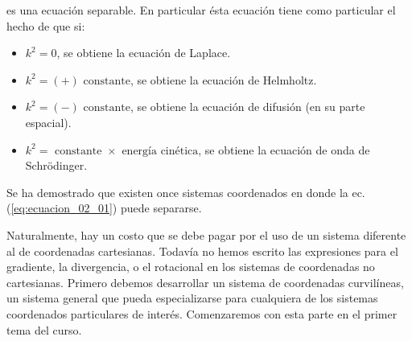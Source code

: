 es una ecuación separable.  En particular ésta ecuación tiene como particular el hecho de que si:
\begin{itemize}
\item $k^{2} = 0$, se obtiene la ecuación de Laplace.
\item $k^{2} = (+) \mbox{ constante}$, se obtiene la ecuación de Helmholtz.
\item $k^{2} = (-) \mbox{ constante}$, se obtiene la ecuación de difusión (en su parte espacial).
\item $k^{2} = \mbox{ constante } \times \mbox{ energía cinética}$, se obtiene la ecuación de onda de Schrödinger.
\end{itemize}
Se ha demostrado que existen once sistemas coordenados en donde la ec. (\ref{eq:ecuacion_02_01}) puede separarse. 
\par
Naturalmente, hay un costo que se debe pagar por el uso de un sistema diferente al de coordenadas cartesianas. Todavía no hemos escrito las expresiones para el gradiente, la divergencia, o el rotacional en los sistemas de coordenadas no cartesianas. Primero debemos desarrollar un sistema de coordenadas curvilíneas, un sistema general que pueda especializarse para cualquiera de los sistemas coordenados particulares de interés. Comenzaremos con esta parte en el primer tema del curso. 
